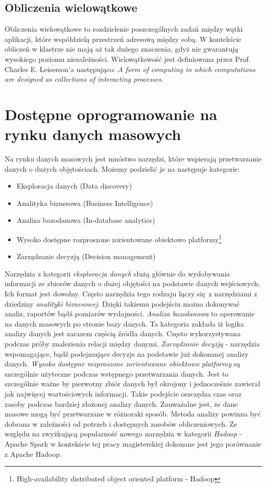 \subsection{Obliczenia wielowątkowe}
Obliczenia wielowątkowe to rozdzielenie poszczególnych zadań między wątki aplikacji, które współdzielą przestrzeń adresową między sobą. W kontekście obliczeń w klastrze nie mają aż tak dużego znaczenia, gdyż nie gwarantują wysokiego poziomu niezależności. Wielowątkowość jest definiowana przez Prof. Charles E. Leiserson'a następująco: 
\newline \textit{A form of computing in which computations are designed as collections of interacting processes.}\cite{mit_presentation}
\section{Dostępne oprogramowanie na rynku danych masowych}
Na rynku danych masowych jest mnóstwo narzędzi, które wspierają przetwarzanie danych o dużych objętościach. Możemy podzielić je na następuje kategorie:
\begin{itemize}
	\item Eksploracja danych (Data discovery)
	\item Analityka biznesowa (Business Intelligence)
	\item Analiza bazodanowa (In-database analytics)
	\item Wysoko dostępne rozproszone zorientowane obiektowo platformy\footnote{High-availability distributed	object oriented platform - Hadoop}
	\item Zarządzanie decyzją (Decision management)    
\end{itemize}
Narzędzia z kategorii \textit{eksploracja danych} służą głównie do wydobywania informacji ze zbiorów danych o dużej objętości na podstawie danych wejściowych. Ich format jest dowolny. Często narzędzia tego rodzaju łączy się z narzędziami z dziedziny \textit{analityki biznesowej}. Dzięki takiemu podejściu można dokonywać analiz, raportów bądź pomiarów wydajności. \textit{Analiza bazodanowa} to operowanie na danych masowych po stronie bazy danych. Ta kategoria zakłada iż logika analizy danych jest zarazem częścią źródła danych. Często wykorzystywana podczas próby znalezienia relacji między danymi. \textit{Zarządzanie decyzją} - narzędzia wspomagające, bądź podejmujące decyzje na podstawie już dokonanej analizy danych. \textit{Wysoko dostępne rozproszone zorientowane obiektowo platformy} są szczególnie użyteczne podczas wstępnego przetwarzania danych. Jest to szczególnie ważne by pierwotny zbiór danych był okrojony i jednocześnie zawierał jak najwięcej wartościowych informacji. Takie podejście oszczędza czas oraz zasoby podczas bardziej złożonej analizy danych.\cite{big_data_tools}
\newline Zauważalne jest, że dane masowe mogą być przetwarzane w różnoraki sposób. Metoda analizy powinna być dobrana w zależności od potrzeb i dostępnych zasobów obliczeniowych. Ze względu na zwyżkującą popularność nowego narzędzia w kategorii \textit{Hadoop} - Apache Spark w kontekście tej pracy magisterskiej dokonane jest jego porównanie z Apache Hadoop.\cite{databricks_survey}  
